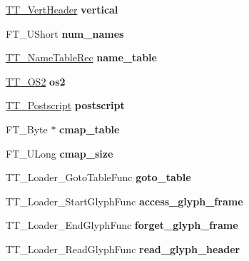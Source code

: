 \begin{DoxyCompactItemize}
\hyperlink{structTT__VertHeader__}{T\+T\+\_\+\+Vert\+Header} {\bfseries vertical}
\item 
\mbox{\label{structTT__FaceRec___ae73033d211e0ac91396e6bb22d594fab}} 
F\+T\+\_\+\+U\+Short {\bfseries num\+\_\+names}
\item 
\mbox{\label{structTT__FaceRec___a33d114b43e6646893f15d39065b77e8c}} 
\hyperlink{structTT__NameTableRec__}{T\+T\+\_\+\+Name\+Table\+Rec} {\bfseries name\+\_\+table}
\item 
\mbox{\label{structTT__FaceRec___a5371adcbd62ade9b74e5f24a03ef09f2}} 
\hyperlink{structTT__OS2__}{T\+T\+\_\+\+O\+S2} {\bfseries os2}
\item 
\mbox{\label{structTT__FaceRec___a598bb9ada92970931585dc51878cf2cd}} 
\hyperlink{structTT__Postscript__}{T\+T\+\_\+\+Postscript} {\bfseries postscript}
\item 
\mbox{\label{structTT__FaceRec___a6a176d2a571102ef8b10b5094f85d9b1}} 
F\+T\+\_\+\+Byte $\ast$ {\bfseries cmap\+\_\+table}
\item 
\mbox{\label{structTT__FaceRec___a4d2e127541e4f223c0b6c5d5aca4c8c5}} 
F\+T\+\_\+\+U\+Long {\bfseries cmap\+\_\+size}
\item 
\mbox{\label{structTT__FaceRec___a3e2e3599abb7737179dbb2fbbd15355d}} 
T\+T\+\_\+\+Loader\+\_\+\+Goto\+Table\+Func {\bfseries goto\+\_\+table}
\item 
\mbox{\label{structTT__FaceRec___a67cce5f4da277e6c8a47d8efe95bc58c}} 
T\+T\+\_\+\+Loader\+\_\+\+Start\+Glyph\+Func {\bfseries access\+\_\+glyph\+\_\+frame}
\item 
\mbox{\label{structTT__FaceRec___ac86fbd960fe6c919eb82cd7233655894}} 
T\+T\+\_\+\+Loader\+\_\+\+End\+Glyph\+Func {\bfseries forget\+\_\+glyph\+\_\+frame}
\item 
\mbox{\label{structTT__FaceRec___a343db3c51a3047324fea455ac06d7cb3}} 
T\+T\+\_\+\+Loader\+\_\+\+Read\+Glyph\+Func {\bfseries read\+\_\+glyph\+\_\+header}

\end{DoxyCompactItemize}
